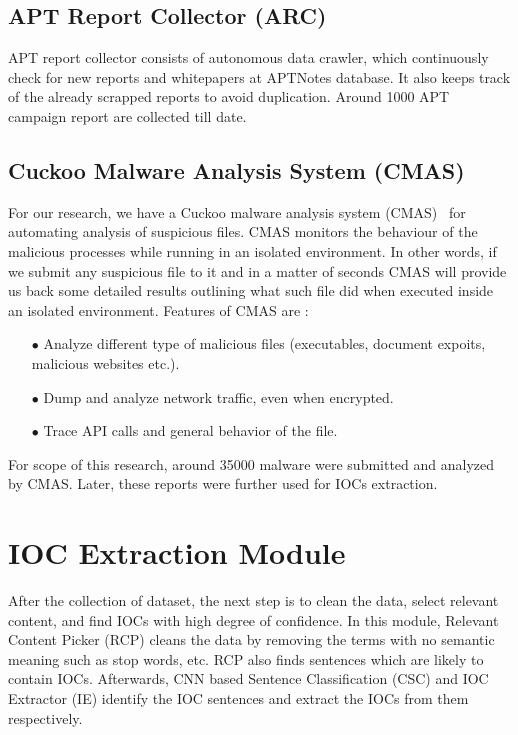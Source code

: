 \subsection{APT Report Collector (ARC)}
APT report collector consists of autonomous data crawler, which continuously check for new reports and whitepapers at APTNotes database. It also keeps track of the already scrapped reports to avoid duplication. Around 1000 APT campaign report are collected till date.

\subsection{Cuckoo Malware Analysis System (CMAS)}
For our research, we have a Cuckoo malware analysis system (CMAS)~\cite{bayer} for automating analysis of suspicious files. CMAS monitors the behaviour of the malicious processes while running in an isolated environment. In other words, if we submit any suspicious file to it and in a matter of seconds CMAS will provide us back some detailed results outlining what such file did when executed inside an isolated environment. Features of CMAS are : 
\begin{itemize}
 \item[$\bullet$ ] Analyze different type of malicious files (executables, document expoits, malicious websites etc.).
  \item[$\bullet$ ] Dump and analyze network traffic, even when encrypted.
  \item[$\bullet$ ] Trace API calls and general behavior of the file.
\end{itemize}

For scope of this research, around 35000 malware were submitted and analyzed by CMAS. Later, these reports were further used for IOCs extraction.

\section{IOC Extraction Module}
After the collection of dataset, the next step is to clean the data, select relevant content, and find IOCs with high degree of confidence. In this module, Relevant Content Picker (RCP) cleans the data by removing the terms with no semantic meaning such as stop words, etc. RCP also finds sentences which are likely to contain IOCs. Afterwards, CNN based Sentence Classification (CSC) and IOC Extractor (IE) identify the IOC sentences and extract the IOCs from them respectively. 



